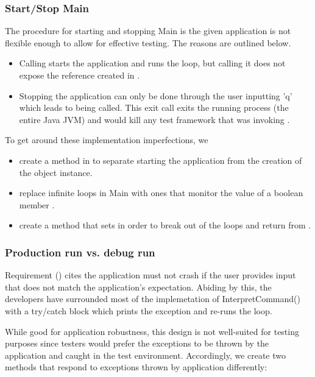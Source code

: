 \subsubsection{Start/Stop Main}
\label{sec:start-stop-main}
The procedure for starting and stopping Main is the given application is not flexible enough to allow for effective testing. The reasons are outlined below.
\begin{itemize}
	\item Calling  starts the application and runs the loop, but calling it does not expose the  reference created in . 
	\item Stopping the application can only be done through the user inputting 'q' which leads to  being called. This exit call exits the running process (the entire Java JVM) and would kill any test framework that was invoking .
\end{itemize}

To get around these implementation imperfections, we 
\begin{itemize}
	\item create a method  in  to separate starting the application from the creation of the  object instance. 
	\item replace infinite loops in Main with ones that monitor the value of a boolean member . 
	\item create a method  that sets  in order to break out of the loops and return from .
\end{itemize}

\subsubsection{Production run vs. debug run}
\label{sec:production-vs-debug}
Requirement (\RSeven) cites the application must not crash if the user provides input that does not match the application's expectation. Abiding by this, the developers have surrounded most of the implemetation of InterpretCommand() with a try/catch block which prints the exception and re-runs the loop. 
\par 
While good for application robustness, this design is not well-suited for testing purposes since testers would prefer the exceptions to be thrown by the application and caught in the test environment. Accordingly, we create two  methods that respond to exceptions thrown by application differently: 

